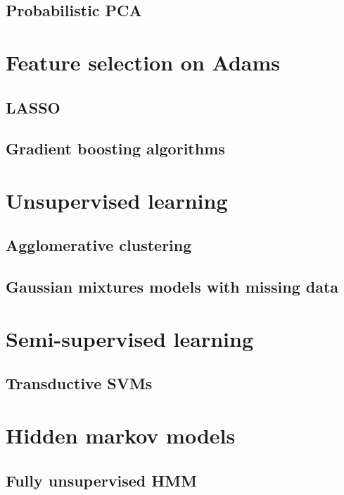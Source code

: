 \documentclass[a4paper, 11pt]{article}
\begin{document}
\subsection{Probabilistic PCA}


\section{Feature selection on Adams}

\subsection{LASSO}

\subsection{Gradient boosting algorithms}

\section{Unsupervised learning}

\subsection{Agglomerative clustering}

\subsection{Gaussian mixtures models with missing data}

\section{Semi-supervised learning}

\subsection{Transductive SVMs}

\section{Hidden markov models}

\subsection{Fully unsupervised HMM}
\end{document}
